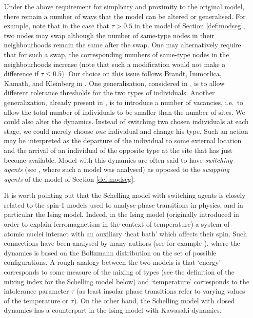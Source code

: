 \documentclass[11pt]{article}
\theoremstyle{plain}
\numberwithin{equation}{subsection}
\begin{document}
Under the above requirement for simplicity and proximity to the original model,
there remain a number of ways that the model can be altered or generalised.
For example, note that in the case that $\tau>0.5$ in the model of
Section  \ref{def:modseg}, two nodes may swap although the number of
same-type nodes in their neighbourhoods remain the same after the swap.
One may alternatively require that for such a swap, the corresponding
numbers of same-type nodes in the neighbourhoods increase
(note that such a modification would not make a difference if $\tau\leq 0.5$).
Our choice on this issue follows Brandt, Immorlica, Kamath, and Kleinberg in
\cite[Section 2]{brandt:an}.
One generalisation, considered in \cite{BELtipl13}, is to allow
different tolerance thresholds for the two types of
individuals. Another generalization, already present in \cite{TS1}, is to introduce a number
of vacancies, i.e.\ to allow the total number of individuals to 
be smaller than the number of sites. 
We could also alter the dynamics. Instead
of switching two chosen individuals at each stage, we could merely choose {\em one}
individual and change his type. Such an action may be 
interpreted as the departure of the individual to some external location and the arrival of an 
individual of the opposite type at the site that has just become available. 
Model with this dynamics are often said to have {\em switching agents}
(see \cite{BELtipl13}, where such a model was analysed) as opposed to the 
{\em swapping agents} of the model of Section \ref{def:modseg}. 

It is worth pointing out that the Schelling model with switching agents
is closely related to the spin-1 models used to analyse phase transitions in physics, and in
particular the Ising model. Indeed, in the Ising model (originally introduced in order to explain
ferromagnetism in the context of temperature) a system of atomic nuclei interact with an 
auxiliary `heat bath' which affects their spin. Such connections have been analysed by many authors
(see for example \cite{SS,DM,PW,GVN,GO}), where the dynamics is based on
the Boltzmann distribution on the set of possible configurations. A rough analogy between
the two models is that `energy'  corresponds to  some measure of the mixing of types
(see the definition of the mixing index for the Schelling model below) and `temperature' 
corresponds to the intolerance parameter $\tau$ (as least insofar phase transitions refer to
varying values of the temperature or $\tau$). On the other hand, 
the Schelling model with closed dynamics has a counterpart in the
Ising model with Kawasaki dynamics.
\end{document}
